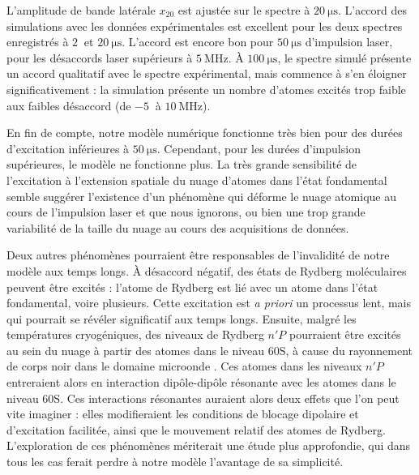 L'amplitude de bande latérale $x_{20}$ est ajustée sur le spectre à $\SI{20}{\us}$. %
L'accord des simulations avec les données expérimentales est excellent pour les deux spectres enregistrés à $\SI{2}{}$ et $\SI{20}{\us}$.
L'accord est encore bon pour $\SI{50}{\us}$ d'impulsion laser, pour les désaccords laser supérieurs à $\SI{5}{\MHz}$.
\`A $\SI{100}{\us}$, le spectre simulé présente un accord qualitatif avec le spectre expérimental, mais commence à s'en éloigner significativement :
la simulation présente un nombre d'atomes excités trop faible aux faibles désaccord (de $\SI{-5}{}$ à $\SI{10}{\MHz}$). %

En fin de compte, notre modèle numérique fonctionne très bien pour des durées d'excitation inférieures à $\SI{50}{\us}$.
Cependant, pour les durées d'impulsion supérieures, le modèle ne fonctionne plus.
La très grande sensibilité de l'excitation à l'extension spatiale du nuage d'atomes dans l'état fondamental semble suggérer l'existence d'un phénomène qui déforme le nuage atomique au cours de l'impulsion laser et que nous ignorons, ou bien une trop grande variabilité de la taille du nuage au cours des acquisitions de données.

Deux autres phénomènes pourraient être responsables de l'invalidité de notre modèle aux temps longs.
\`A désaccord négatif, des états de Rydberg \og moléculaires \fg{} peuvent être excités \cite{MX_PFAUMOLECULES14} : l'atome de Rydberg est lié avec un atome dans l'état fondamental, voire plusieurs. Cette excitation est \textit{a priori} un processus lent, mais qui pourrait se révéler significatif aux temps longs.
Ensuite, malgré les températures cryogéniques, des niveaux de Rydberg $n'P$ pourraient être excités au sein du nuage à partir des atomes dans le niveau $\mathrm{60S}$, à cause du rayonnement de corps noir dans le domaine microonde \cite{MX_PORTORYDDRESS16}.
Ces atomes dans les niveaux $n'P$ entreraient alors en interaction dipôle-dipôle résonante avec les atomes dans le niveau $\mathrm{60S}$.
Ces interactions résonantes auraient alors deux effets que l'on peut vite imaginer : elles modifieraient les conditions de blocage dipolaire et d'excitation facilitée, ainsi que le mouvement relatif des atomes de Rydberg. %
L'exploration de ces phénomènes mériterait une étude plus approfondie, qui dans tous les cas ferait perdre à notre modèle l'avantage de sa simplicité.

